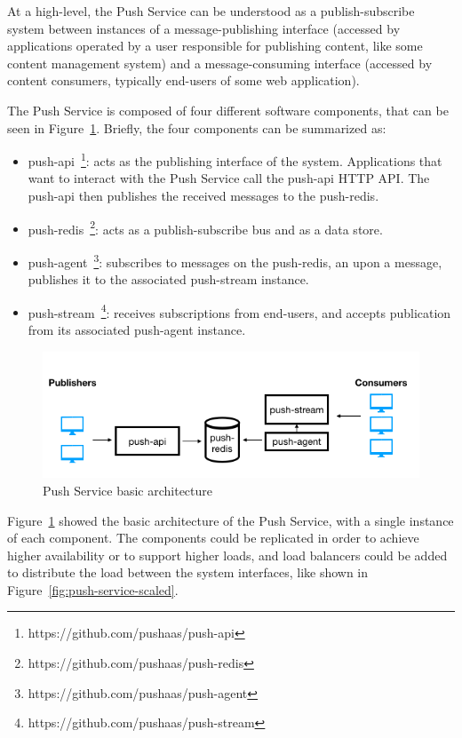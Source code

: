 At a high-level, the Push Service can be understood as a publish-subscribe system between instances of a message-publishing interface (accessed by applications operated by a user responsible for publishing content, like some content management system) and a message-consuming interface (accessed by content consumers, typically end-users of some web application).

The Push Service is composed of four different software components, that can be seen in Figure~\ref{fig:push-service}. Briefly, the four components can be summarized as:
\begin{itemize}
    \item push-api~\footnote{https://github.com/pushaas/push-api}: acts as the publishing interface of the system. Applications that want to interact with the Push Service call the push-api HTTP API. The push-api then publishes the received messages to the push-redis.
    \item push-redis~\footnote{https://github.com/pushaas/push-redis}: acts as a publish-subscribe bus and as a data store.
    \item push-agent~\footnote{https://github.com/pushaas/push-agent}: subscribes to messages on the push-redis, an upon a message, publishes it to the associated push-stream instance.
    \item push-stream~\footnote{https://github.com/pushaas/push-stream}: receives subscriptions from end-users, and accepts publication from its associated push-agent instance.
\end{itemize}

\begin{figure}
	\caption{Push Service basic architecture}
	\label{fig:push-service}
	\centering%
	\includegraphics[width=\linewidth]{images/push-service.png}
\end{figure}

Figure~\ref{fig:push-service} showed the basic architecture of the Push Service, with a single instance of each component. The components could be replicated in order to achieve higher availability or to support higher loads, and load balancers could be added to distribute the load between the system interfaces, like shown in Figure~\ref{fig:push-service-scaled}.

